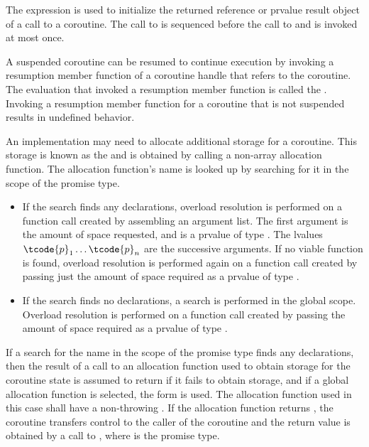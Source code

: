 \pnum
The expression  is used
to initialize
the returned reference or prvalue result object of a call to a coroutine.
The call to 
is sequenced before
the call to 
and is invoked at most once.

\pnum
A suspended coroutine can be resumed to continue execution by invoking
a resumption member function
of a coroutine handle
that refers to the coroutine.
The evaluation that invoked a resumption member function is
called the .
Invoking a resumption member function for a coroutine
that is not suspended results in undefined behavior.

\pnum
An implementation may need to allocate additional storage for a coroutine.
This storage is known as the  and is obtained by calling
a non-array allocation function.
The allocation function's name is looked up by searching for it in the scope of the promise type.
\begin{itemize}
\item
If the search finds any declarations,
overload resolution is performed on a function call created by assembling an
argument list. The first argument is the amount of space requested, and
is a prvalue of type .
The lvalues $\tcode{p}_1 \dotsc \tcode{p}_n$ are the successive arguments.
If no viable function is found,
overload resolution is performed again
on a function call created by passing just
the amount of space required as a prvalue of type .
\item
If the search finds no declarations, a search is performed in the global scope.
Overload resolution is performed on a function call created by
passing the amount of space required as a prvalue of type .
\end{itemize}

\pnum
If a search for the name 
in the scope of the promise type finds
any declarations, then the result
of a call to an allocation function used to obtain storage for the coroutine
state is assumed to return  if it fails to obtain storage,
and if a global allocation function is selected,
the  form is used.
The allocation function used in this case shall have a non-throwing
.
If the allocation function returns , the coroutine transfers
control to the caller of the coroutine and the return value is obtained by a
call to , where 
is the promise type.


